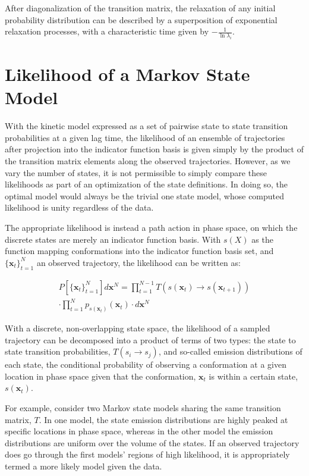 \documentclass[twocolumn,floatfix,nofootinbib,aps]{revtex4-1}
\begin{document}
After diagonalization of the transition matrix, the relaxation of any initial probability distribution can be described by a superposition of exponential relaxation processes, with a characteristic time given by $-\frac{1}{\ln \lambda_i}$.

\section{Likelihood of a Markov State Model}
With the kinetic model expressed as a set of pairwise state to state transition probabilities at a given lag time, the likelihood of an ensemble of trajectories after projection into the indicator function basis is given simply by the product of the transition matrix elements along the observed trajectories. However, as we vary the number of states, it is not permissible to simply compare these likelihoods as part of an optimization of the state definitions. In doing so, the optimal model would always be the trivial one state model, whose computed likelihood is unity regardless of the data.

The appropriate likelihood is instead a path action in phase space, on which the discrete states are merely an indicator function basis. With $s(X)$ as the function mapping conformations into the indicator function basis set, and $\{\mathbf{x}_t\}_{t=1}^N$ an observed trajectory, the likelihood can be written as:

\begin{equation}
\begin{split}
P\left[\{\mathbf{x}_t\}_{t=1}^N\right] d\mathbf{x}^N = \prod_{t=1}^{N-1} T(s(\mathbf{x}_t) \rightarrow s(\mathbf{x}_{t+1})) \\
\cdot \prod_{t=1}^{N} p_{s(\mathbf{x}_t)}(\mathbf{x}_{t}) \cdot d\mathbf{x}^N
\label{eq:like}
\end{split}
\end{equation}

With a discrete, non-overlapping state space, the likelihood of a sampled trajectory can be decomposed into a product of terms of two types: the state to state transition probabilities, $T(s_i \rightarrow s_j)$, and so-called emission distributions of each state, the conditional probability of observing a conformation at a given location in phase space given that the conformation, $\mathbf{x}_t$ is within a certain state, $s(\mathbf{x}_t)$.

For example, consider two Markov state models sharing the same transition matrix, $T$. In one model, the state emission distributions are highly peaked at specific locations in phase space, whereas in the other model the emission distributions are uniform over the volume of the states. If an observed trajectory does go through the first models' regions of high likelihood, it is appropriately termed a more likely model given the data.
\end{document}
